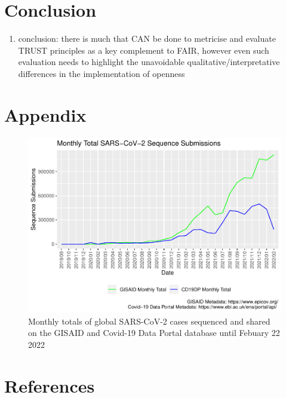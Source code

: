 \documentclass{article}
\providecommand{\tightlist}{%
  \setlength{\itemsep}{0pt}\setlength{\parskip}{0pt}}
\begin{document}
\hypertarget{conclusion}{%
\section{Conclusion}\label{conclusion}}

\begin{enumerate}
\def\labelenumi{(\arabic{enumi})}
\setcounter{enumi}{5}
\tightlist
\item
  conclusion: there is much that CAN be done to metricise and evaluate
  TRUST principles as a key complement to FAIR, however even such
  evaluation needs to highlight the unavoidable
  qualitative/interpretative differences in the implementation of
  openness
\end{enumerate}

\hypertarget{appendix}{%
\section{Appendix}\label{appendix}}

\begin{figure}
\centering
\includegraphics{Report_files/figure-latex/fig2-1.pdf}
\caption{Monthly totals of global SARS-CoV-2 cases sequenced and shared
on the GISAID and Covid-19 Data Portal database until Febuary 22 2022}
\end{figure}

\hypertarget{references}{%
\section*{References}\label{references}}
\end{document}
